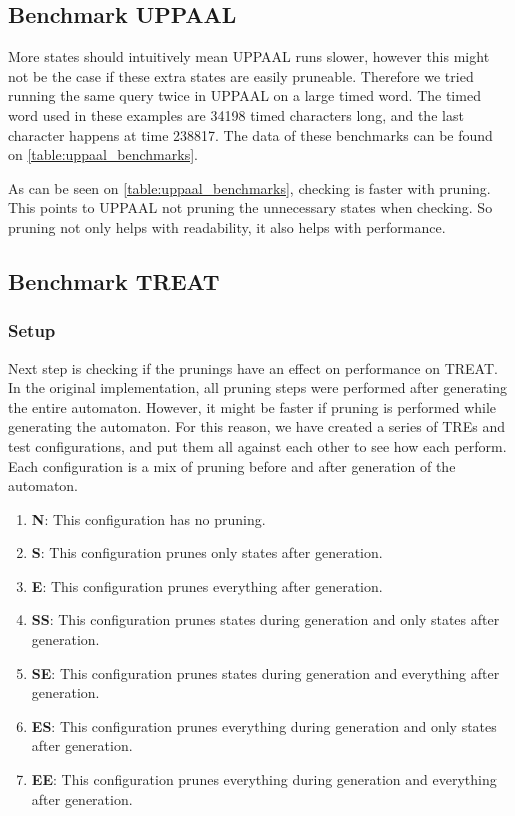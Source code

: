 \subsection{Benchmark UPPAAL}\label{sub:benchmark_uppaal}
More states should intuitively mean UPPAAL runs slower, however this might not be the case if these extra states are easily pruneable.
Therefore we tried running the same query twice in UPPAAL on a large timed word.
The timed word used in these examples are 34198 timed characters long, and the last character happens at time 238817.
The data of these benchmarks can be found on \cref{table:uppaal_benchmarks}.



As can be seen on \cref{table:uppaal_benchmarks}, checking is faster with pruning.
This points to UPPAAL not pruning the unnecessary states when checking.
So pruning not only helps with readability, it also helps with performance. 

\subsection{Benchmark TREAT}
\subsubsection{Setup}
Next step is checking if the prunings have an effect on performance on TREAT.
In the original implementation, all pruning steps were performed after generating the entire automaton.
However, it might be faster if pruning is performed while generating the automaton.
For this reason, we have created a series of TREs and test configurations, and put them all against each other to see how each perform.
Each configuration is a mix of pruning before and after generation of the automaton.

\begin{enumerate}
    \item \textbf{N}: This configuration has no pruning.
    \item \textbf{S}: This configuration prunes only states after generation.
    \item \textbf{E}: This configuration prunes everything after generation.
    \item \textbf{SS}: This configuration prunes states during generation and only states after generation.
    \item \textbf{SE}: This configuration prunes states during generation and everything after generation.
    \item \textbf{ES}: This configuration prunes everything during generation and only states after generation.
    \item \textbf{EE}: This configuration prunes everything during generation and everything after generation.
\end{enumerate}

